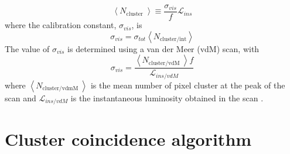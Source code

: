 \begin{equation}
    \left\langle N_{\text {cluster }}\right\rangle\equiv\frac{\sigma_{vis}}{f}\mathcal{L}_{ins}
\end{equation}
where the calibration constant, $\sigma_{vis}$, is   
\begin{equation}
    \sigma_{vis}=\sigma_{tot}\left\langle N_{\text {cluster/int}}\right\rangle
\end{equation}
The value of $\sigma_{vis}$ is determined using a van der Meer (vdM) scan, with 
\begin{equation}
    \sigma_{vis}= \frac{\left\langle N_{\text {cluster/vdM }}\right\rangle f }{\mathcal{L}_{ins/vdM}}
\end{equation}
where $\left\langle N_{\text {cluster/vdmM }}\right\rangle$ is the mean number of pixel cluster at the peak of the scan and $\mathcal{L}_{ins/vdM}$ is the instantaneous luminosity obtained in the scan \cite{CMS-PAS-LUM-12-001}.


\section{Cluster coincidence algorithm }

